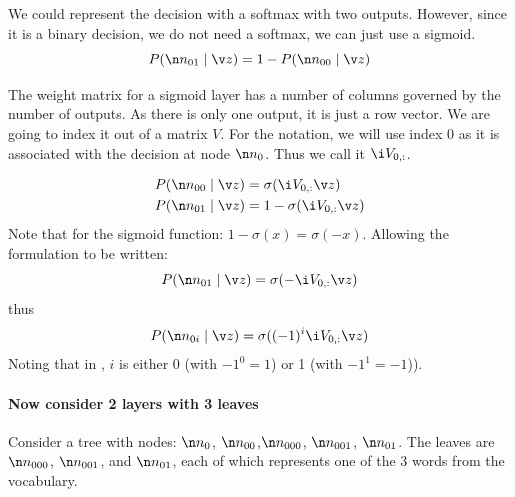 {We could represent the decision with a softmax with two outputs.
However, since it is a binary decision, we do not need a softmax, we
can just use a sigmoid.
\begin{equation}
P(\n n_{01}\mid \v z)= 1 - P(\n n_{00}\mid \v z)
\end{equation}

The weight matrix for a sigmoid layer has a number of columns governed
by the number of outputs.
As there is only one output, it is just a row vector.
We are going to index it out of a matrix $V$.
For the notation, we will use index $0$ as it is associated with the decision at node $\n n_{0}$.
Thus we call it $\i V_{0,:}$.


\begin{align}
P(\n n_{00} \mid \v z) &=\sigma(\i V_{0,:} \v z) \\
P(\n n_{01} \mid \v z) &=1-\sigma(\i V_{0,:} \v z)
\end{align}
Note that for the sigmoid function: $1-\sigma(x)=\sigma(-x)$.
Allowing the formulation to be written:
\begin{equation}
P(\n n_{01}\mid \v z)=\sigma({-}\i V_{0,:}\v z)
\end{equation}
thus
\begin{equation}
P(\n n_{0i}\mid \v z)=\sigma(({-}1)^i \i V_{0,:}\v z) \label{equ:hsoftmaxbinfirst}
\end{equation}
Noting that in , $i$ is either 0 (with ${-1}^0=1$) or 1 (with ${-1}^1={-}1$)).


\paragraph{Now consider 2 layers with 3 leaves}

Consider a tree with nodes: $\n n_{0}$, $\n n_{00}$,$\n n_{000}$, $\n n_{001}$, $\n n_{01}$.
The leaves are $\n n_{000}$, $\n n_{001}$, and $\n n_{01}$, each of which represents one of the 3 words from the vocabulary.


}
